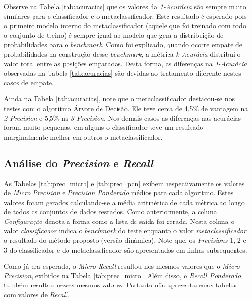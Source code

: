 Observe na Tabela \ref{tab:acuracias} que os valores da \textit{1-Acurácia} são sempre muito similares para o classificador e o metaclassificador.
Este resultado é esperado pois o primeiro modelo interno do metaclassificador (aquele que foi treinado com todo o conjunto de treino) é sempre igual ao modelo que gera a distribuição de probabilidades para o \textit{benchmark}.
Como foi explicado, quando ocorre empate de probabilidades na construção desse \textit{benchmark}, a métrica \textit{k-Acurácia} distribui o valor total entre as posições empatadas.
Desta forma, as diferenças na \textit{1-Acurácia} observadas na Tabela \ref{tab:acuracias} são devidas ao tratamento diferente nestes casos de empate.

Ainda na Tabela \ref{tab:acuracias}, note que o metaclassificador destacou-se nos testes com o algoritmo Árvore de Decisão.
Ele teve cerca de 4,5\% de vantagem na \textit{2-Precision} e 5,5\% na \textit{3-Precision}.
Nos demais casos as diferenças nas acurácias foram muito pequenas, em alguns o classificador teve um resultado marginalmente melhor em outros o metaclassificador.

\subsection{Análise do \textit{Precision} e \textit{Recall}}

As Tabelas \ref{tab:prec_micro} e \ref{tab:prec_pon} exibem respectivamente os valores de \textit{Micro Precision} e \textit{Precision Ponderado} médios para cada algoritmo.
Estes valores foram gerados calculando-se a média aritmética de cada métrica ao longo de todos os conjuntos de dados testados.
Como anteriormente, a coluna \textit{Configuração} denota a forma como a lista de saída foi gerada. 
Nesta coluna o valor \textit{classificador} indica o \textit{benchmark} do teste enquanto o valor \textit{metaclassificador} o resultado do método proposto (versão dinâmica).
Note que, os \textit{Precisions} 1, 2 e 3 do classificador e do metaclassificador são apresentados em linhas subsequentes.

Como já era esperado, o \textit{Micro Recall} resultou nos mesmos valores que o \textit{Micro Precision}, exibidos na Tabela \ref{tab:prec_micro}.
Além disso, o \textit{Recall Ponderado} também resultou nesses mesmos valores.
Portanto não apresentaremos tabelas com valores de \textit{Recall}.

